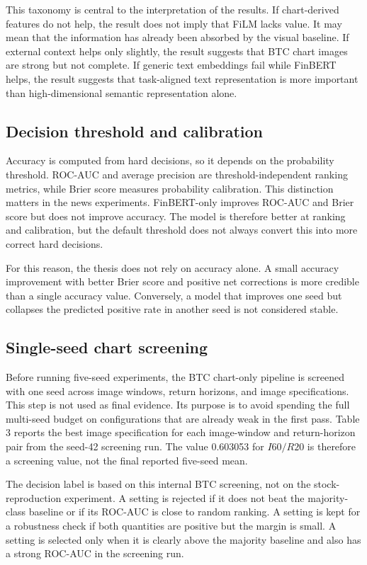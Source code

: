 \documentclass[14pt,a4paper]{extarticle}
\begin{document}
This taxonomy is central to the interpretation of the results. If chart-derived features do not help, the result does not imply that FiLM lacks value. It may mean that the information has already been absorbed by the visual baseline. If external context helps only slightly, the result suggests that BTC chart images are strong but not complete. If generic text embeddings fail while FinBERT helps, the result suggests that task-aligned text representation is more important than high-dimensional semantic representation alone.

\subsection{Decision threshold and calibration}

Accuracy is computed from hard decisions, so it depends on the probability threshold. ROC-AUC and average precision are threshold-independent ranking metrics, while Brier score measures probability calibration. This distinction matters in the news experiments. FinBERT-only improves ROC-AUC and Brier score but does not improve accuracy. The model is therefore better at ranking and calibration, but the default threshold does not always convert this into more correct hard decisions.

For this reason, the thesis does not rely on accuracy alone. A small accuracy improvement with better Brier score and positive net corrections is more credible than a single accuracy value. Conversely, a model that improves one seed but collapses the predicted positive rate in another seed is not considered stable.

\subsection{Single-seed chart screening}

Before running five-seed experiments, the BTC chart-only pipeline is screened with one seed across image windows, return horizons, and image specifications. This step is not used as final evidence. Its purpose is to avoid spending the full multi-seed budget on configurations that are already weak in the first pass. Table 3 reports the best image specification for each image-window and return-horizon pair from the seed-42 screening run. The value 0.603053 for $I60/R20$ is therefore a screening value, not the final reported five-seed mean.

The decision label is based on this internal BTC screening, not on the stock-reproduction experiment. A setting is rejected if it does not beat the majority-class baseline or if its ROC-AUC is close to random ranking. A setting is kept for a robustness check if both quantities are positive but the margin is small. A setting is selected only when it is clearly above the majority baseline and also has a strong ROC-AUC in the screening run.
\end{document}
